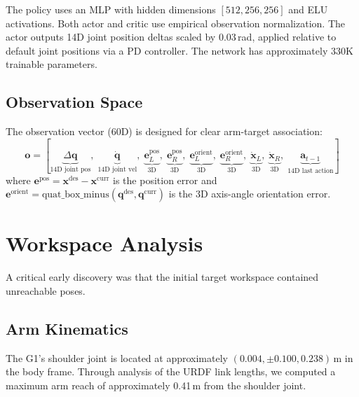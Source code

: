 \documentclass[11pt,a4paper]{article}
\begin{document}
\noindent The policy uses an MLP with hidden dimensions $[512, 256, 256]$ and ELU activations. Both actor and critic use empirical observation normalization. The actor outputs 14D joint position deltas scaled by 0.03\,rad, applied relative to default joint positions via a PD controller. The network has approximately 330K trainable parameters.

\subsection{Observation Space}
The observation vector (60D) is designed for clear arm-target association:
\begin{equation}
  \mathbf{o} = [\underbrace{\Delta\mathbf{q}}_{\text{14D joint pos}},\;\underbrace{\dot{\mathbf{q}}}_{\text{14D joint vel}},\;\underbrace{\mathbf{e}_L^{\text{pos}}}_{\text{3D}},\;\underbrace{\mathbf{e}_R^{\text{pos}}}_{\text{3D}},\;\underbrace{\mathbf{e}_L^{\text{orient}}}_{\text{3D}},\;\underbrace{\mathbf{e}_R^{\text{orient}}}_{\text{3D}},\;\underbrace{\dot{\mathbf{x}}_L}_{\text{3D}},\;\underbrace{\dot{\mathbf{x}}_R}_{\text{3D}},\;\underbrace{\mathbf{a}_{t-1}}_{\text{14D last action}}]
\end{equation}
where $\mathbf{e}^{\text{pos}} = \mathbf{x}^{\text{des}} - \mathbf{x}^{\text{curr}}$ is the position error and $\mathbf{e}^{\text{orient}} = \text{quat\_box\_minus}(\mathbf{q}^{\text{des}}, \mathbf{q}^{\text{curr}})$ is the 3D axis-angle orientation error.

\section{Workspace Analysis}
\label{sec:workspace}

A critical early discovery was that the initial target workspace contained unreachable poses.

\subsection{Arm Kinematics}
The G1's shoulder joint is located at approximately $(0.004, \pm0.100, 0.238)$\,m in the body frame. Through analysis of the URDF link lengths, we computed a maximum arm reach of approximately 0.41\,m from the shoulder joint.
\end{document}
